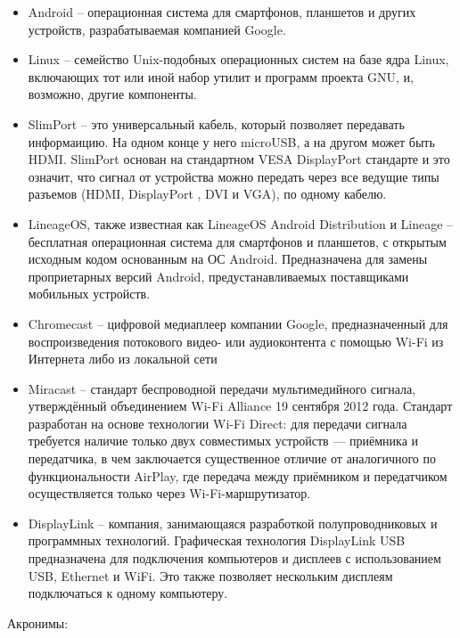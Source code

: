 \documentclass[a4paper, 14pt]{article}
\begin{document}
\begin{itemize}
    \item Android -- операционная система для смартфонов, планшетов и других устройств, разрабатываемая компанией Google.
    \item Linux -- семейство Unix-подобных операционных систем на базе ядра Linux, включающих тот или иной набор утилит и программ проекта GNU, и, возможно, другие компоненты.
    \item SlimPort -- это универсальный кабель, который позволяет передавать информаицию. На одном конце у него microUSB, а на другом может быть HDMI. SlimPort основан на стандартном VESA DisplayPort стандарте и это означит, что сигнал от устройства можно передать через все ведущие типы разъемов (HDMI, DisplayPort , DVI и VGA), по одному кабелю.
    \item LineageOS, также известная как LineageOS Android Distribution и Lineage -- бесплатная операционная система для смартфонов и планшетов, с открытым исходным кодом основанным на ОС Android. Предназначена для замены проприетарных версий Android, предустанавливаемых поставщиками мобильных устройств.
    \item Chromecast -- цифровой медиаплеер компании Google, предназначенный для воспроизведения потокового видео- или аудиоконтента с помощью Wi-Fi из Интернета либо из локальной сети
    \item Miracast -- стандарт беспроводной передачи мультимедийного сигнала, утверждённый объединением Wi-Fi Alliance 19 сентября 2012 года. Стандарт разработан на основе технологии Wi-Fi Direct: для передачи сигнала требуется наличие только двух совместимых устройств — приёмника и передатчика, в чем заключается существенное отличие от аналогичного по функциональности AirPlay, где передача между приёмником и передатчиком осуществляется только через Wi-Fi-маршрутизатор.
    \item DisplayLink -- компания, занимающаяся разработкой полупроводниковых и программных технологий. Графическая технология DisplayLink USB предназначена для подключения компьютеров и дисплеев с использованием USB, Ethernet и WiFi. Это также позволяет нескольким дисплеям подключаться к одному компьютеру.
\end{itemize}

\par Акронимы:
\end{document}
